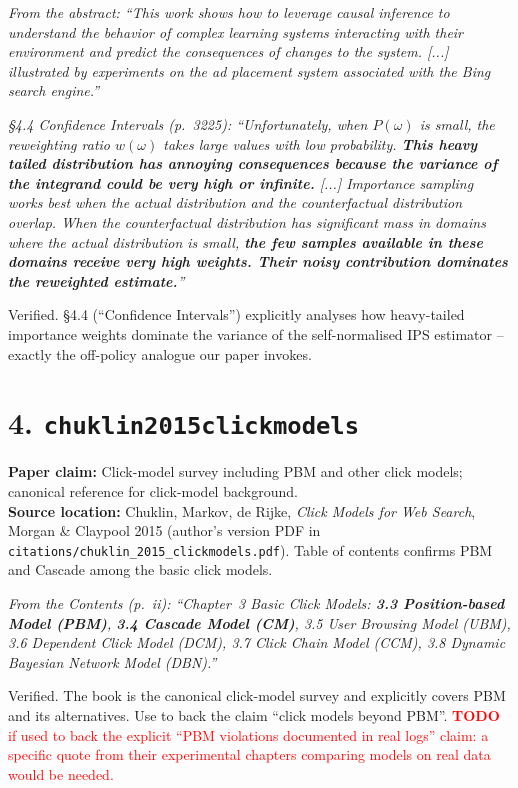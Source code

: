 \documentclass[11pt]{article}
\newcommand{\paperclaim}[1]{\textbf{Paper claim:} #1}
\newcommand{\source}[1]{\textbf{Source location:} #1}
\newcommand{\quoted}[1]{\begin{tcolorbox}\textit{#1}\end{tcolorbox}}
\begin{document}
\quoted{From the abstract: ``This work shows how to leverage causal
inference to understand the behavior of complex learning systems
interacting with their environment and predict the consequences of
changes to the system. [...] illustrated by experiments on the ad
placement system associated with the Bing search engine.''}

\quoted{\S4.4 Confidence Intervals (p.~3225): ``Unfortunately, when
$P(\omega)$ is small, the reweighting ratio $w(\omega)$ takes large
values with low probability. \textbf{This heavy tailed distribution has
annoying consequences because the variance of the integrand could be
very high or infinite.} [...] Importance sampling works best when the
actual distribution and the counterfactual distribution overlap. When
the counterfactual distribution has significant mass in domains where
the actual distribution is small, \textbf{the few samples available in
these domains receive very high weights. Their noisy contribution
dominates the reweighted estimate.}''}

\noindent Verified. \S4.4 (``Confidence Intervals'') explicitly analyses
how heavy-tailed importance weights dominate the variance of the
self-normalised IPS estimator -- exactly the off-policy analogue our
paper invokes.

\bigskip

\section*{4. \texttt{chuklin2015clickmodels}}
\paperclaim{Click-model survey including PBM and other click models;
canonical reference for click-model background.}\\
\source{Chuklin, Markov, de Rijke, \emph{Click Models for Web Search},
Morgan \& Claypool 2015 (author's version PDF in
\texttt{citations/chuklin\_2015\_clickmodels.pdf}).
Table of contents confirms PBM and Cascade among the basic click models.}

\quoted{From the Contents (p.~ii): ``Chapter~3 Basic Click Models:
\textbf{3.3 Position-based Model (PBM)}, \textbf{3.4 Cascade Model (CM)},
3.5 User Browsing Model (UBM), 3.6 Dependent Click Model (DCM), 3.7 Click
Chain Model (CCM), 3.8 Dynamic Bayesian Network Model (DBN).''}

\noindent Verified. The book is the canonical click-model survey and
explicitly covers PBM and its alternatives. Use to back the claim
``click models beyond PBM''.
\textcolor{red}{\textbf{TODO} if used to back the explicit ``PBM violations
documented in real logs'' claim: a specific quote from their experimental
chapters comparing models on real data would be needed.}
\end{document}
